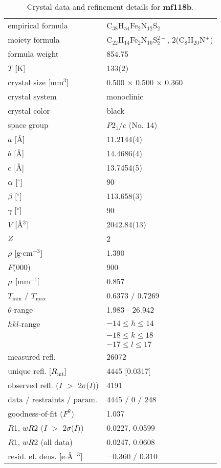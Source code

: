 \documentclass[a4paper]{scrartcl}
\begin{document}
\begin{table}[!ht]
\caption{ Crystal data and refinement details for \textbf{mf118b}.}
\begin{tabular}{ll}
\hline
empirical formula & C$_{38}$H$_{54}$Fe$_{2}$N$_{12}$S$_{2}$ \\
moiety formula & C$_{22}$H$_{14}$Fe$_{2}$N$_{10}$S$_{2}^{2-}$, 2(C$_{8}$H$_{20}$N$_{}^{+}$) \\
formula weight & 854.75 \\
$T$ [K] & 133(2) \\
crystal size [mm$^{3}$] & 0.500 $\times$ 0.500 $\times$ 0.360 \\
crystal system & monoclinic \\
crystal color & black \\
space group & $P2_1/c$ (No. 14) \\
$a$ [\r{A}] & 11.2144(4) \\
$b$ [\r{A}] & 14.4686(4) \\
$c$ [\r{A}] & 13.7454(5) \\
$\alpha$ [$^{\circ}$] & 90 \\
$\beta$ [$^{\circ}$] & 113.658(3) \\
$\gamma$ [$^{\circ}$] & 90 \\
$V$ [\r{A}$^{3}$] & 2042.84(13) \\
$Z$ & 2 \\
$\rho$ [g$\cdot$cm$^{-3}$] & 1.390 \\
$F$(000) & 900 \\
$\mu$ [mm$^{-1}$] & 0.857 \\
$T_\mathrm{min}$ / $T_\mathrm{max}$ & 0.6373 / 0.7269 \\
$\theta$-range & 1.983 - 26.942 \\
$hkl$-range & $-14\leq h \leq14$ \\
 & $-18\leq k \leq18$ \\
 & $-17\leq l \leq17$ \\
measured refl. & 26072 \\
unique refl. [$R_\mathrm{int}$] & 4445 [0.0317] \\
observed refl. ($I$ $>$ 2$\sigma$($I$)) & 4191 \\
data / restraints / param. & 4445 / 0 / 248 \\
goodness-of-fit ($F^{2}$) & 1.037 \\
$R$1, $wR$2 ($I$ $>$ 2$\sigma$($I$)) & 0.0227, 0.0599 \\
$R$1, $wR$2 (all data) & 0.0247, 0.0608 \\
resid. el. dens. [e$\cdot$\r{A}$^{-3}$] & $-0.360$ / 0.310 \\
\hline
\end{tabular}
\end{table}
\end{document}
